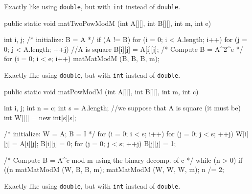 \begin{tabb} Exactly like  using \texttt{double}, but with \texttt{int} instead
  of \texttt{double}.
\end{tabb}
\begin{htmlonly}
\end{htmlonly}
\begin{code}

   public static void matTwoPowModM (int A[][], int B[][], int m, int e) \begin{hide} {
      int i, j;
      /* initialize: B = A */
      if (A != B) {
         for (i = 0; i < A.length; i++) {
            for (j = 0; j < A.length;  ++j)  //A is square
               B[i][j] = A[i][j];
         }
      }
      /* Compute B = A^{2^e} */
      for (i = 0; i < e; i++)
         matMatModM (B, B, B, m);
   } \end{hide}
\end{code}
\begin{tabb} Exactly like  using \texttt{double}, but with \texttt{int} instead of
  \texttt{double}.
\end{tabb}
\begin{htmlonly}
\end{htmlonly}
\begin{code}

   public static void matPowModM (int A[][], int B[][], int m, int c) \begin{hide} {
      int i, j;
      int n = c;
      int s = A.length;   //we suppose that A is square (it must be)
      int W[][] = new int[s][s];

      /* initialize: W = A; B = I */
      for (i = 0; i < s; i++) {
         for (j = 0; j < s;  ++j)  {
            W[i][j] = A[i][j];
            B[i][j] = 0;
         }
      }
      for (j = 0; j < s;  ++j)
         B[j][j] = 1;

      /* Compute B = A^c mod m using the binary decomp. of c */
      while (n > 0) {
         if ((n %
            matMatModM (W, B, B, m);
         matMatModM (W, W, W, m);
         n /= 2;
      }
   } \end{hide}
\end{code}
\begin{tabb} Exactly like  using \texttt{double}, but with \texttt{int} instead
  of \texttt{double}.
\end{tabb}
\begin{htmlonly}
\end{htmlonly}




